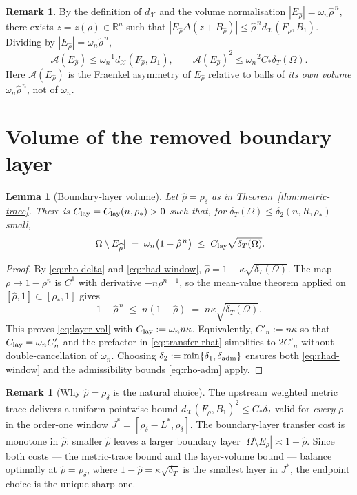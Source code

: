 \documentclass[11pt]{article}
\newtheorem{lemma}[theorem]{Lemma}
\theoremstyle{definition}
\newtheorem{remark}[theorem]{Remark}
\newcommand{\R}{\mathbb{R}}
\newcommand{\Fr}{\mathcal{A}}
\newcommand{\Om}{\Omega}
\newcommand{\rstar}{\rho_{*}}
\newcommand{\rhad}{\widehat\rho}
\newcommand{\X}{\mathcal X}
\begin{document}
\begin{remark}\label{rem:asym-as-distance}
By the definition of $d_{\X}$ and the volume normalisation
$|E_{\rhad}|=\omega_n\rhad^{\,n}$, there exists
$z=z(\rhad)\in\R^n$ such that
$|E_{\rhad}\Delta(z+B_{\rhad})|\le \rhad^{\,n}d_{\X}(F_{\rhad},B_1)$.
Dividing by $|E_{\rhad}|=\omega_n\rhad^{\,n}$,
\begin{equation}\label{eq:Aerho}
\Fr(E_{\rhad})\le \omega_n^{-1}d_{\X}(F_{\rhad},B_1),
\qquad
\Fr(E_{\rhad})^{2}\le \omega_n^{-2}C_*\delta_T(\Om).
\end{equation}
Here $\Fr(E_{\rhad})$ is the Fraenkel asymmetry of $E_{\rhad}$
relative to balls of \emph{its own volume} $\omega_n\rhad^{\,n}$,
not of $\omega_n$.
\end{remark}

\section{Volume of the removed boundary layer}\label{sec:layer-volume}

\begin{lemma}[Boundary-layer volume]\label{lem:layer-vol}
Let $\rhad=\rho_\delta$ as in Theorem~\ref{thm:metric-trace}. There is
$C_{\rm lay}=C_{\rm lay}(n,\rstar)>0$ such that, for
$\delta_T(\Om)\le\delta_2(n,R,\rstar)$ small,
\begin{equation}\label{eq:layer-vol}
|\Om\setminus E_{\rhad}|\;=\;\omega_n\bigl(1-\rhad^{\,n}\bigr)
\;\le\; C_{\rm lay}\sqrt{\delta_T(\Om)}.
\end{equation}
\end{lemma}

\begin{proof}
By \eqref{eq:rho-delta} and \eqref{eq:rhad-window},
$\rhad=1-\kappa\sqrt{\delta_T(\Om)}$.  The map $\rho\mapsto 1-\rho^n$ is
$C^1$ with derivative $-n\rho^{n-1}$, so the mean-value theorem applied
on $[\rhad,1]\subset[\rstar,1]$ gives
\[
   1-\rhad^{\,n}\;\le\;n(1-\rhad)\;=\;n\kappa\sqrt{\delta_T(\Om)}.
\]
This proves \eqref{eq:layer-vol} with
$C_{\rm lay}:=\omega_n n\kappa$. Equivalently, $C'_n:=n\kappa$ so that
$C_{\rm lay}=\omega_n C'_n$ and the
prefactor in \eqref{eq:transfer-rhat} simplifies to $2C'_n$ without
double-cancellation of $\omega_n$.  Choosing
$\delta_2:=\min\{\delta_1,\delta_{\rm adm}\}$ ensures both
\eqref{eq:rhad-window} and the admissibility bounds
\eqref{eq:rho-adm} apply.
\end{proof}

\begin{remark}[Why $\rhad=\rho_\delta$ is the natural choice]
\label{rem:why-rho-delta}
The upstream weighted metric trace
\cite[Thm.~5.6, Rem.~5.7]{WeightedMetricTrace} delivers a uniform
pointwise bound $d_\X(F_\rho,B_1)^2\le C_*\delta_T$ valid for
\emph{every} $\rho$ in the order-one window $J^*=[\rho_\delta-L^*,\rho_\delta]$.
The boundary-layer transfer cost is monotone in $\rhad$: smaller
$\rhad$ leaves a larger boundary layer
$|\Om\setminus E_{\rhad}|\asymp 1-\rhad$.  Since both costs --- the
metric-trace bound and the layer-volume bound --- balance optimally at
$\rhad=\rho_\delta$, where $1-\rhad=\kappa\sqrt{\delta_T}$ is the
smallest layer in $J^*$, the endpoint choice is the unique sharp one.
\end{remark}
\end{document}
